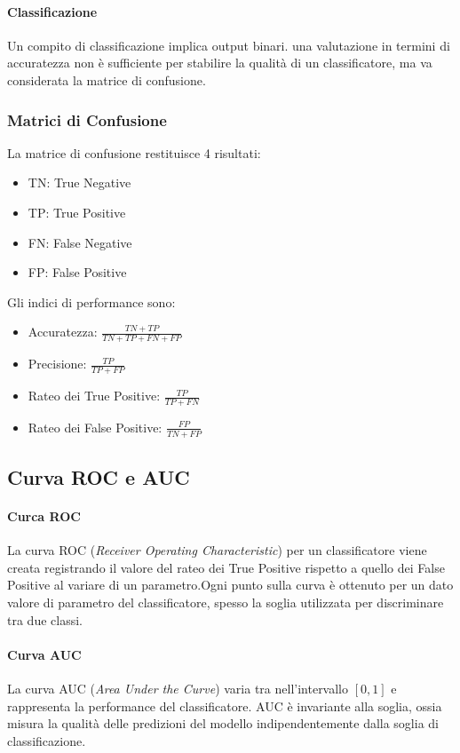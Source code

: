 \documentclass[12pt, a4paper]{article}
\begin{document}
\paragraph{Classificazione} Un compito di classificazione implica output binari. una valutazione in termini di accuratezza non è sufficiente per stabilire la qualità di un classificatore, ma va considerata la matrice di confusione.

\subsubsection{Matrici di Confusione}
La matrice di confusione restituisce 4 risultati:
\begin{itemize}
    \item TN: True Negative
    \item TP: True Positive
    \item FN: False Negative
    \item FP: False Positive
\end{itemize}
Gli indici di performance sono:
\begin{itemize}
    \item Accuratezza: \(\frac{TN+TP}{TN+TP+FN+FP}\)
    \item Precisione: \(\frac{TP}{TP+FP}\)
    \item Rateo dei True Positive: \(\frac{TP}{TP+FN}\)
    \item Rateo dei False Positive: \(\frac{FP}{TN+FP}\)
\end{itemize}

\subsection{Curva ROC e AUC}
\paragraph{Curca ROC} La curva ROC (\textit{Receiver Operating Characteristic}) per un classificatore viene creata registrando il valore del rateo dei True Positive rispetto a quello dei False Positive al variare di un parametro.Ogni punto sulla curva è ottenuto per un dato valore di parametro del classificatore, spesso la soglia utilizzata per discriminare tra due classi.
\paragraph{Curva AUC} La curva AUC (\textit{Area Under the Curve}) varia tra nell'intervallo \([0,1]\) e rappresenta la performance del classificatore. AUC è invariante alla soglia, ossia misura la qualità delle predizioni del modello indipendentemente dalla soglia di classificazione.
\end{document}
